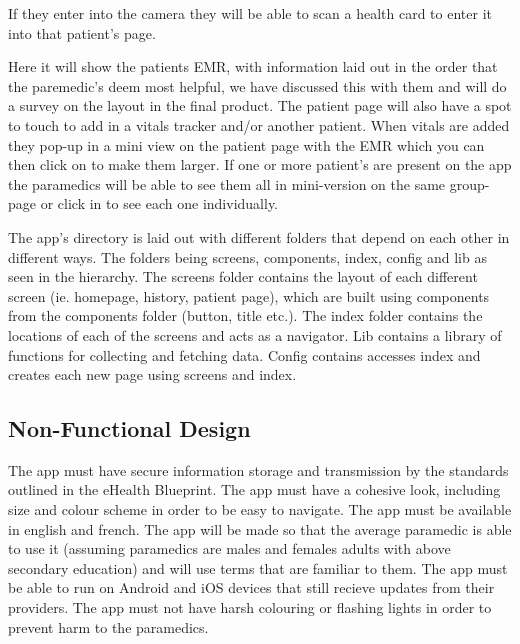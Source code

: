 If they enter into the camera they will be able to scan a health card to enter it into that patient's page.

Here it will show the patients EMR, with information laid out in the order that the paremedic's deem most helpful, we have discussed this with them and will do a survey on the layout in the final product. The patient page will also have a spot to touch to add in a vitals tracker and/or another patient. When vitals are added they pop-up in a mini view on the patient page with the EMR which you can then click on to make them larger. If one or more patient's are present on the app the paramedics will be able to see them all in mini-version on the same group-page or click in to see each one individually.  

The app's directory is laid out with different folders that depend on each other in different ways. The folders being screens, components, index, config and lib as seen in the hierarchy. The screens folder contains the layout of each different screen (ie. homepage, history, patient page), which are built using components from the components folder (button, title etc.). The index folder contains the locations of each of the screens and acts as a navigator. Lib contains a library of functions for collecting and fetching data. Config contains accesses index and creates each new page using screens and index.






\subsection{Non-Functional Design}
The app must have secure information storage and transmission by the standards outlined in the eHealth Blueprint. The app must have a cohesive look, including size and colour scheme in order to be easy to navigate. The app must be available in english and french. The app will be made so that the average paramedic is able to use it (assuming paramedics are males and females adults with above secondary education) and will use terms that are familiar to them.
The app must be able to run on Android and iOS devices that still recieve updates from their providers. The app must not have harsh colouring or flashing lights in order to prevent harm to the paramedics.
